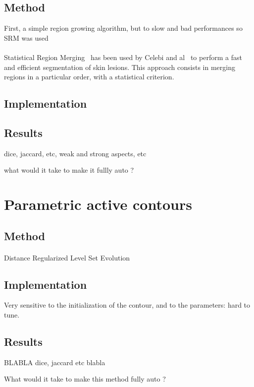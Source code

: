 \documentclass[a4paper,10pt]{article}
\begin{document}
\subsection{Method}
First, a simple region growing algorithm, but to slow and bad performances so SRM was used
\paragraph{} Statistical Region Merging~\cite{nock_statistical_2004} has been 
used by Celebi and al~\cite{celebi_border_2008} to perform a fast and efficient 
segmentation of skin lesions. This approach consists in merging regions in a particular order, with a statistical criterion.
\subsection{Implementation}

\subsection{Results}
dice, jaccard, etc, weak and strong aspects, etc

what would it take to make it fullly auto ?

\section{Parametric active contours}
\subsection{Method}
\paragraph{}  Distance Regularized Level Set Evolution \cite{li2010distance} 
\subsection{Implementation}
Very sensitive to the initialization of the contour, and to the parameters: hard to tune.

\subsection{Results}

BLABLA dice, jaccard etc
blabla

What would it take to make this method fully auto ?
\end{document}
